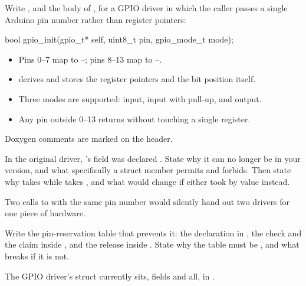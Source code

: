 \label{exb:q:7}

 Write , and the body of , for a GPIO driver in which
the caller passes a single Arduino pin number rather than register pointers:

\begin{ccode}
bool gpio_init(gpio_t* self, uint8_t pin, gpio_mode_t mode);
\end{ccode}

\begin{itemize}
  \item Pins 0--7 map to --; pins 8--13 map to
    --.
  \item {} derives and stores the register pointers and the bit position itself.
  \item Three modes are supported: input, input with pull-up, and output.
  \item Any pin outside 0--13 returns  without touching a single register.
\end{itemize}
Doxygen comments are marked on the header. 

 In the original driver, 's  field was declared
. State why it can no longer be  in your version, and what
specifically a  struct member permits and forbids. Then state why 
takes  while  takes , and what would
change if either took  by value instead. 

 Two calls to  with the same pin number would silently hand out two
drivers for one piece of hardware.

Write the pin-reservation table that prevents it: the declaration in , the check and
the claim inside , and the release inside . State why the table
must be , and what breaks if it is not. 

\label{exb:q:8}

 The GPIO driver's struct currently sits, fields and all, in .


